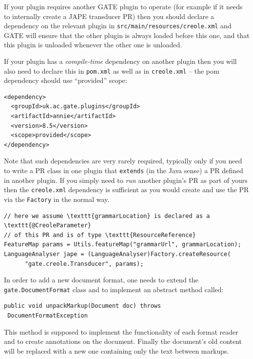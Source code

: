 If your plugin requires another GATE plugin to operate (for
example if it needs to internally create a JAPE transducer PR) then you
should declare a dependency on the relevant plugin in
\texttt{src/main/resources/creole.xml} and GATE will ensure that the other
plugin is always loaded before this one, and that this plugin is unloaded
whenever the other one is unloaded.

If your plugin has a \emph{compile-time} dependency on another plugin then you
will also need to declare this in \texttt{pom.xml} as well as in
\texttt{creole.xml} -- the pom dependency should use ``provided'' scope:
\begin{verbatim}
<dependency>
  <groupId>uk.ac.gate.plugins</groupId>
  <artifactId>annie</artifactId>
  <version>8.5</version>
  <scope>provided</scope>
</dependency>
\end{verbatim}
%
Note that such dependencies are very rarely required, typically only if you
need to write a PR class in one plugin that \texttt{extends} (in the Java
sense) a PR defined in another plugin.  If you simply need to \emph{run}
another plugin's PR as part of yours then the \texttt{creole.xml} dependency is
sufficient as you would create and use the PR via the \texttt{Factory} in the
normal way.
\begin{lstlisting}
// here we assume \texttt{grammarLocation} is declared as a \texttt{@CreoleParameter}
// of this PR and is of type \texttt{ResourceReference}
FeatureMap params = Utils.featureMap("grammarUrl", grammarLocation);
LanguageAnalyser jape = (LanguageAnalyser)Factory.createResource(
      "gate.creole.Transducer", params);
\end{lstlisting}


In order to add a new document format, one needs to
extend the {\tt gate.DocumentFormat} class and to implement an
abstract method called:

\begin{lstlisting}
public void unpackMarkup(Document doc) throws
 DocumentFormatException
\end{lstlisting} 
 
This method is supposed to implement the functionality of each format
reader and to create annotations on the document. Finally the
document's old content will be replaced with a new one containing only
the text between markups.

